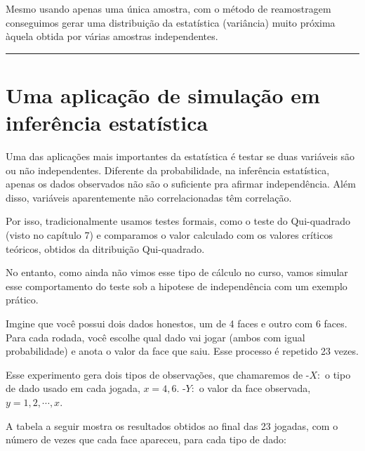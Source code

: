 \documentclass[
]{book}
\begin{document}
Mesmo usando apenas uma única amostra, com o método de reamostragem conseguimos gerar uma distribuição da estatística (variância) muito próxima àquela obtida por várias amostras independentes.

\begin{center}\rule{0.5\linewidth}{0.5pt}\end{center}

\section{Uma aplicação de simulação em inferência estatística}\label{uma-aplicauxe7uxe3o-de-simulauxe7uxe3o-em-inferuxeancia-estatuxedstica}

Uma das aplicações mais importantes da estatística é testar se duas variáveis são ou não independentes. Diferente da probabilidade, na inferência estatística, apenas os dados observados não são o suficiente pra afirmar independência. Além disso, variáveis aparentemente não correlacionadas têm correlação.

Por isso, tradicionalmente usamos testes formais, como o teste do Qui-quadrado (visto no capítulo 7) e comparamos o valor calculado com os valores críticos teóricos, obtidos da ditribuição Qui-quadrado.

No entanto, como ainda não vimos esse tipo de cálculo no curso, vamos simular esse comportamento do teste sob a hipotese de independência com um exemplo prático.

Imgine que você possui dois dados honestos, um de 4 faces e outro com 6 faces. Para cada rodada, você escolhe qual dado vai jogar (ambos com igual probabilidade) e anota o valor da face que saiu. Esse processo é repetido 23 vezes.

Esse experimento gera dois tipos de observações, que chamaremos de
-\(X:\) o tipo de dado usado em cada jogada, \(x = {4, 6}\).
-\(Y:\) o valor da face observada, \(y = 1, 2, \cdots, x\).

A tabela a seguir mostra os resultados obtidos ao final das 23 jogadas, com o número de vezes que cada face apareceu, para cada tipo de dado:
\end{document}
